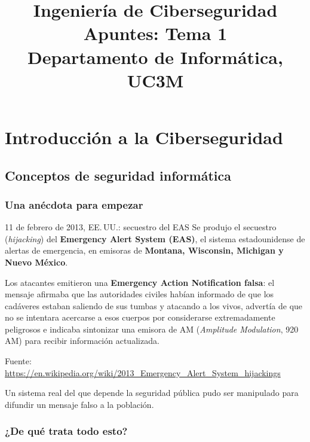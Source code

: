 \documentclass[11pt,a4paper]{report}
\title{\textbf{Ingeniería de Ciberseguridad}\\[4pt]\large Apuntes: Tema 1\\Departamento de Informática, UC3M}
\author{}
\date{}
\begin{document}
\maketitle
\tableofcontents

\part{Introducción a la Ciberseguridad}

\chapter{Conceptos de seguridad informática}

\section{Una anécdota para empezar}

\begin{ejemplo}{11 de febrero de 2013, EE.\,UU.: secuestro del EAS}
Se produjo el secuestro (\emph{hijacking}) del \textbf{Emergency Alert System (EAS)}, el sistema estadounidense de alertas de emergencia, en emisoras de \textbf{Montana, Wisconsin, Michigan y Nuevo México}.

Los atacantes emitieron una \textbf{Emergency Action Notification falsa}: el mensaje afirmaba que las autoridades civiles habían informado de que los cadáveres estaban saliendo de sus tumbas y atacando a los vivos, advertía de que no se intentara acercarse a esos cuerpos por considerarse extremadamente peligrosos e indicaba sintonizar una emisora de AM (\emph{Amplitude Modulation}, 920\,AM) para recibir información actualizada.

\smallskip
{\footnotesize Fuente: \url{https://en.wikipedia.org/wiki/2013_Emergency_Alert_System_hijackings}}
\end{ejemplo}

\begin{importante}[title={Idea clave}]
Un sistema real del que depende la seguridad pública pudo ser manipulado para difundir un mensaje falso a la población.
\end{importante}

\section{¿De qué trata todo esto?}
\end{document}
